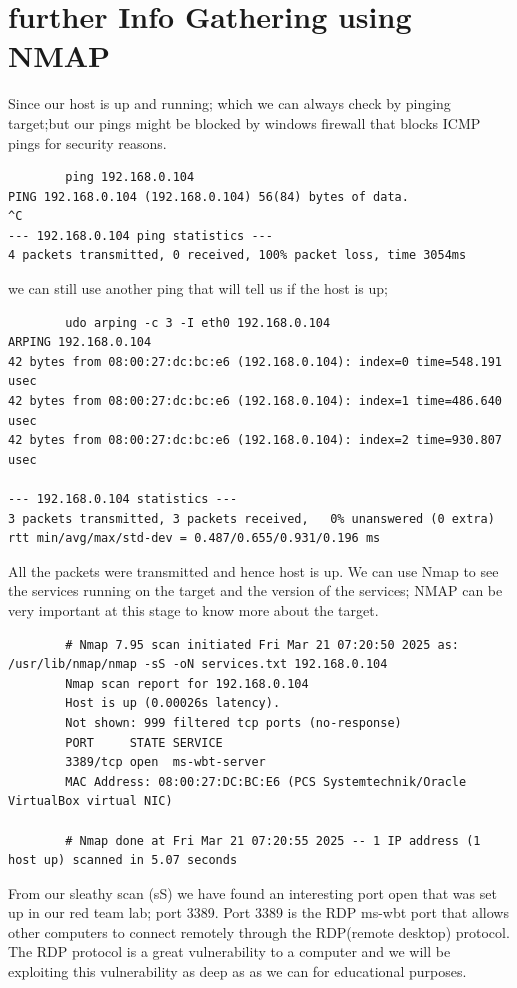 \documentclass[a4paper,12pt]{article}
\begin{document}
\newpage{}
\section{further Info Gathering using NMAP}
Since our host is up and running; which we can always check by pinging target;but our pings might be blocked by windows firewall
that blocks ICMP pings for security reasons.
\begin{verbatim}
        ping 192.168.0.104
PING 192.168.0.104 (192.168.0.104) 56(84) bytes of data.
^C
--- 192.168.0.104 ping statistics ---
4 packets transmitted, 0 received, 100% packet loss, time 3054ms
\end{verbatim}
we can still use another ping that will tell us if the host is up;
\begin{verbatim}
        udo arping -c 3 -I eth0 192.168.0.104
ARPING 192.168.0.104
42 bytes from 08:00:27:dc:bc:e6 (192.168.0.104): index=0 time=548.191 usec
42 bytes from 08:00:27:dc:bc:e6 (192.168.0.104): index=1 time=486.640 usec
42 bytes from 08:00:27:dc:bc:e6 (192.168.0.104): index=2 time=930.807 usec

--- 192.168.0.104 statistics ---
3 packets transmitted, 3 packets received,   0% unanswered (0 extra)
rtt min/avg/max/std-dev = 0.487/0.655/0.931/0.196 ms

\end{verbatim}
All the packets were transmitted and hence host is up.
We can use Nmap to see the services running on the target and the version of the services; NMAP can be very important at this stage 
to know more about the target.
\begin{verbatim}
        # Nmap 7.95 scan initiated Fri Mar 21 07:20:50 2025 as: /usr/lib/nmap/nmap -sS -oN services.txt 192.168.0.104
        Nmap scan report for 192.168.0.104
        Host is up (0.00026s latency).
        Not shown: 999 filtered tcp ports (no-response)
        PORT     STATE SERVICE
        3389/tcp open  ms-wbt-server
        MAC Address: 08:00:27:DC:BC:E6 (PCS Systemtechnik/Oracle VirtualBox virtual NIC)
        
        # Nmap done at Fri Mar 21 07:20:55 2025 -- 1 IP address (1 host up) scanned in 5.07 seconds      
\end{verbatim}
From our sleathy scan (sS) we have found an interesting port open that was set up in our red team lab; port 3389.
Port 3389 is the RDP ms-wbt port that allows other computers to connect remotely through the RDP(remote desktop) protocol.
The RDP protocol is a great vulnerability to a computer and we will be exploiting this vulnerability as deep as as we can for
educational purposes.
\end{document}
